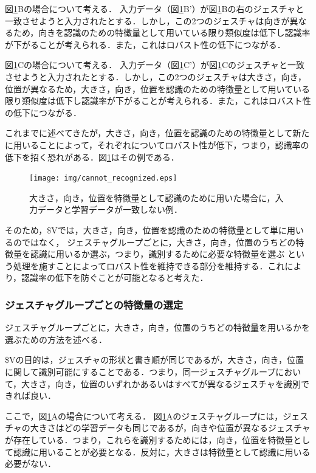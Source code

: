図\ref{fig:cannot_recognized}Bの場合について考える．
入力データ（図\ref{fig:cannot_recognized}B'）が図\ref{fig:cannot_recognized}Bの右のジェスチャと一致させようと入力されたとする．しかし，この2つのジェスチャは向きが異なるため，向きを認識のための特徴量として用いている限り類似度は低下し認識率が下がることが考えられる．また，これはロバスト性の低下につながる．

図\ref{fig:cannot_recognized}Cの場合について考える．
入力データ（図\ref{fig:cannot_recognized}C'）が図\ref{fig:cannot_recognized}Cのジェスチャと一致させようと入力されたとする．しかし，この2つのジェスチャは大きさ，向き，位置が異なるため，大きさ，向き，位置を認識のための特徴量として用いている限り類似度は低下し認識率が下がることが考えられる．また，これはロバスト性の低下につながる．

これまでに述べてきたが，大きさ，向き，位置を認識のための特徴量として新たに用いることによって，それぞれについてロバスト性が低下，つまり，認識率の低下を招く恐れがある．図\ref{fig:cannot_recognized}はその例である．

\begin{figure} [h!]
	\begin{center}
		\texttt{[image: img/cannot\_recognized.eps]}
	\end{center}
	\caption{大きさ，向き，位置を特徴量として認識のために用いた場合に，入力データと学習データが一致しない例．}
	\label{fig:cannot_recognized}
\end{figure}

そのため，\$Vでは，大きさ，向き，位置を認識のための特徴量として単に用いるのではなく，
ジェスチャグループごとに，大きさ，向き，位置のうちどの特徴量を認識に用いるか選ぶ，つまり，識別するために必要な特徴量を選ぶ
という処理を施すことによってロバスト性を維持できる部分を維持する．これにより，認識率の低下を防ぐことが可能となると考えた．

\subsubsection{ジェスチャグループごとの特徴量の選定}
ジェスチャグループごとに，大きさ，向き，位置のうちどの特徴量を用いるかを選ぶための方法を述べる．

\$Vの目的は，ジェスチャの形状と書き順が同じであるが，大きさ，向き，位置に関して識別可能にすることである．つまり，同一ジェスチャグループにおいて，大きさ，向き，位置のいずれかあるいはすべてが異なるジェスチャを識別できれば良い．

ここで，図\ref{fig:cannot_recognized}Aの場合について考える．
図\ref{fig:cannot_recognized}Aのジェスチャグループには，ジェスチャの大きさはどの学習データも同じであるが，向きや位置が異なるジェスチャが存在している．つまり，これらを識別するためには，向き，位置を特徴量として認識に用いることが必要となる．反対に，大きさは特徴量として認識に用いる必要がない．

